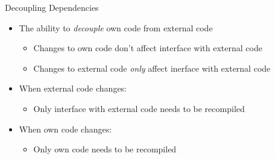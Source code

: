 \begin{secframe}{Decoupling Dependencies}


    \begin{itemize}

        \item The ability to \textit{decouple} own code from external code\\
            \begin{itemize}
                \item Changes to own code don't affect interface with external code
                \item Changes to external code \textit{only} affect inerface with external code
            \end{itemize}

        \item When external code changes:\\
            \begin{itemize}
                \item Only interface with external code needs to be recompiled
            \end{itemize}

        \item When own code changes:\\
            \begin{itemize}
                \item Only own code needs to be recompiled
            \end{itemize}

    \end{itemize}

    \vfill

\end{secframe}

